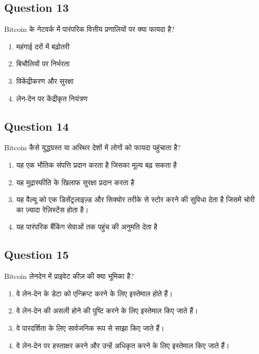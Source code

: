\documentclass[12pt,a4paper]{article}
\begin{document}
\bigskip


\subsection*{Question 13}
Bitcoin के नेटवर्क में पारंपरिक वित्तीय प्रणालियों पर क्या फायदा है?

\begin{enumerate}[label=\Alph*., leftmargin=*]
\item महंगाई दरों में बढ़ोतरी
\item बिचौलियों पर निर्भरता
\item विकेंद्रीकरण और सुरक्षा
\item लेन-देन पर केंद्रीकृत नियंत्रण
\end{enumerate}

\bigskip


\subsection*{Question 14}
Bitcoin कैसे युद्धग्रस्त या अस्थिर देशों में लोगों को फायदा पहुंचाता है?

\begin{enumerate}[label=\Alph*., leftmargin=*]
\item यह एक भौतिक संपत्ति प्रदान करता है जिसका मूल्य बढ़ सकता है
\item यह मुद्रास्फीति के खिलाफ सुरक्षा प्रदान करता है
\item यह वैल्यू को एक डिसेंट्रलाइज़्ड और सिक्योर तरीके से स्टोर करने की सुविधा देता है जिसमें चोरी का ज़्यादा रेज़िस्टेंस होता है।
\item यह पारंपरिक बैंकिंग सेवाओं तक पहुंच की अनुमति देता है
\end{enumerate}

\bigskip


\subsection*{Question 15}
Bitcoin लेनदेन में प्राइवेट कीज़ की क्या भूमिका है?

\begin{enumerate}[label=\Alph*., leftmargin=*]
\item वे लेन-देन के डेटा को एन्क्रिप्ट करने के लिए इस्तेमाल होते हैं।
\item वे लेन-देन की असली होने की पुष्टि करने के लिए इस्तेमाल किए जाते हैं।
\item वे पारदर्शिता के लिए सार्वजनिक रूप से साझा किए जाते हैं।
\item वे लेन-देन पर हस्ताक्षर करने और उन्हें अधिकृत करने के लिए इस्तेमाल किए जाते हैं।
\end{enumerate}
\end{document}
